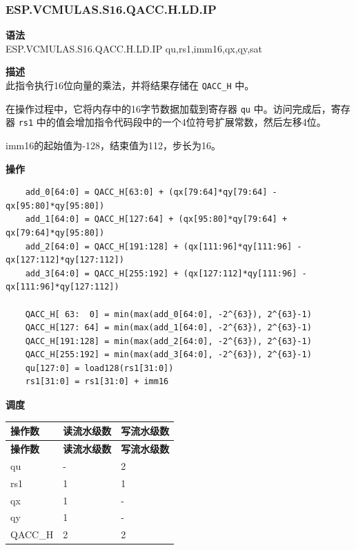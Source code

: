 \newpage

\newpage
\subsubsection{ESP.VCMULAS.S16.QACC.H.LD.IP}\label{instruction:ESPVCMULASS16QACC_HLDIP}
\textbf{语法}\\
ESP.VCMULAS.S16.QACC.H.LD.IP qu,rs1,imm16,qx,qy,sat

\textbf{描述}\\
此指令执行16位向量的乘法，并将结果存储在 \lstinline{QACC_H} 中。

在操作过程中，它将内存中的16字节数据加载到寄存器 \lstinline{qu} 中。访问完成后，寄存器 \lstinline{rs1} 中的值会增加指令代码段中的一个4位符号扩展常数，然后左移4位。

imm16的起始值为-128，结束值为112，步长为16。

\textbf{操作}\\
\begin{lstlisting}
    add_0[64:0] = QACC_H[63:0] + (qx[79:64]*qy[79:64] - qx[95:80]*qy[95:80])
    add_1[64:0] = QACC_H[127:64] + (qx[95:80]*qy[79:64] + qx[79:64]*qy[95:80])
    add_2[64:0] = QACC_H[191:128] + (qx[111:96]*qy[111:96] - qx[127:112]*qy[127:112])
    add_3[64:0] = QACC_H[255:192] + (qx[127:112]*qy[111:96] - qx[111:96]*qy[127:112])

    QACC_H[ 63:  0] = min(max(add_0[64:0], -2^{63}), 2^{63}-1)
    QACC_H[127: 64] = min(max(add_1[64:0], -2^{63}), 2^{63}-1)
    QACC_H[191:128] = min(max(add_2[64:0], -2^{63}), 2^{63}-1)
    QACC_H[255:192] = min(max(add_3[64:0], -2^{63}), 2^{63}-1)
    qu[127:0] = load128(rs1[31:0])
    rs1[31:0] = rs1[31:0] + imm16
\end{lstlisting}

\textbf{调度}\\
\begin{longtable}[c]{|l|l|l|}
    \hline
    \rowcolor{lightgray}
    \textbf{操作数} & \textbf{读流水级数} & \textbf{写流水级数} \\\hline
    \endfirsthead
    \hline
    \rowcolor{lightgray}
     \textbf{操作数} & \textbf{读流水级数} & \textbf{写流水级数} \\\hline
    \endhead
    \hline
    \endfoot

    qu & - & 2 \\\hline
    rs1 & 1 & 1 \\\hline
     qx & 1 & - \\\hline
     qy & 1 & - \\\hline
     QACC\_H & 2 & 2

\end{longtable}

